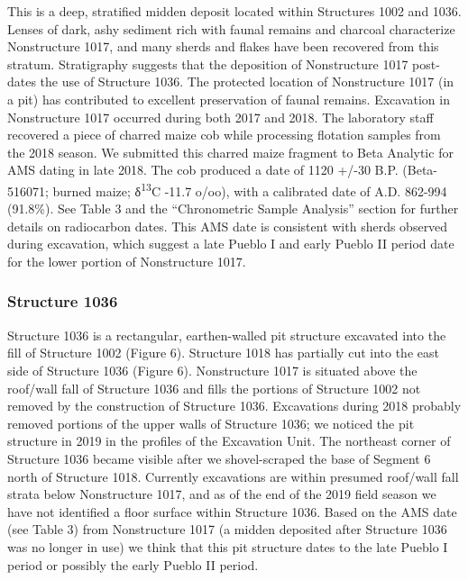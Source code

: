 \documentclass[
  12pt,
]{krantz}
\begin{document}
This is a deep, stratified midden deposit located within Structures 1002
and 1036. Lenses of dark, ashy sediment rich with faunal remains and
charcoal characterize Nonstructure 1017, and many sherds and flakes have
been recovered from this stratum. Stratigraphy suggests that the
deposition of Nonstructure 1017 post-dates the use of Structure 1036.
The protected location of Nonstructure 1017 (in a pit) has contributed
to excellent preservation of faunal remains. Excavation in Nonstructure
1017 occurred during both 2017 and 2018. The laboratory staff recovered
a piece of charred maize cob while processing flotation samples from the
2018 season. We submitted this charred maize fragment to Beta Analytic
for AMS dating in late 2018. The cob produced a date of 1120 +/-30 B.P.
(Beta-516071; burned maize; δ\textsuperscript{13}C -11.7 o/oo), with a calibrated date
of A.D. 862-994 (91.8\%). See Table 3 and the ``Chronometric Sample
Analysis'' section for further details on radiocarbon dates. This AMS
date is consistent with sherds observed during excavation, which suggest
a late Pueblo I and early Pueblo II period date for the lower portion of
Nonstructure 1017.

\hypertarget{structure-1036}{%
\subsubsection{Structure 1036}\label{structure-1036}}

Structure 1036 is a rectangular, earthen-walled pit structure excavated
into the fill of Structure 1002 (Figure 6). Structure 1018 has partially
cut into the east side of Structure 1036 (Figure 6). Nonstructure 1017
is situated above the roof/wall fall of Structure 1036 and fills the
portions of Structure 1002 not removed by the construction of Structure
1036. Excavations during 2018 probably removed portions of the upper
walls of Structure 1036; we noticed the pit structure in 2019 in the
profiles of the Excavation Unit. The northeast corner of Structure 1036
became visible after we shovel-scraped the base of Segment 6 north of
Structure 1018. Currently excavations are within presumed roof/wall fall
strata below Nonstructure 1017, and as of the end of the 2019 field
season we have not identified a floor surface within Structure 1036.
Based on the AMS date (see Table 3) from Nonstructure 1017 (a midden
deposited after Structure 1036 was no longer in use) we think that this
pit structure dates to the late Pueblo I period or possibly the early
Pueblo II period.
\end{document}
